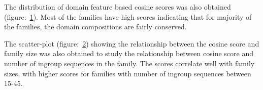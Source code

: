 \documentclass{article}
\begin{document}
		The distribution of domain feature based cosine scores was also obtained (figure:~\ref{fig:hist_domain_cosine_scores_lgf5}). Most of the families have high scores indicating that for majority of the families, the domain compositions are fairly conserved. 
		
		\begin{figure}
			\caption{}
			\label{fig:hist_domain_cosine_scores_lgf5}
		\end{figure}
		
		The scatter-plot (figure:~\ref{fig:scatter_domain_cosine_vs_seq_ct_lgf5}) showing the relationship between the cosine score and family size was also obtained to study the relationship between cosine score and number of ingroup sequences in the family. The scores correlate well with family sizes, with higher scores for families with number of ingroup sequences between 15-45.
		
		\begin{figure}
			\caption{}
			\label{fig:scatter_domain_cosine_vs_seq_ct_lgf5}
		\end{figure}
		
\end{document}
